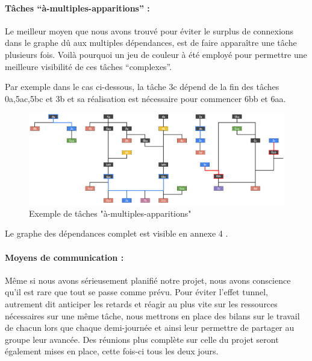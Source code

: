 \documentclass[a4paper,12pt]{article} %
\begin{document}
\newpage
\paragraph{Tâches “à-multiples-apparitions” :\\}

Le meilleur moyen que nous avons trouvé pour éviter le surplus de connexions dans le graphe dû aux multiples dépendances, est de faire apparaître une tâche plusieurs fois.
Voilà pourquoi un jeu de couleur à été employé pour permettre une meilleure visibilité de ces tâches “complexes”.

Par exemple dans le cas ci-dessous, la tâche 3c dépend de la fin des tâches 0a,5ac,5bc et 3b et sa réalisation est nécessaire pour commencer 6bb et 6aa.

\begin{figure}[h]
\begin{center}
\includegraphics[width=17cm]{tachemul.png} 
\end{center}
\caption{Exemple de tâches "à-multiples-apparitions"}
\end{figure}

Le graphe des dépendances complet est visible en annexe 4 .

\paragraph{Moyens de communication :\\}

Même si nous avons sérieusement planifié notre projet, nous avons conscience qu’il est rare que tout se passe comme prévu. Pour éviter l’effet tunnel, autrement dit anticiper les retards et réagir au plus vite sur les ressources nécessaires sur une même tâche, nous mettrons en place des bilans sur le travail de chacun lors que chaque demi-journée et ainsi leur permettre de partager au groupe leur avancée. Des réunions plus complète sur celle du projet seront également mises en place, cette fois-ci tous les deux jours.
\\
\end{document}
